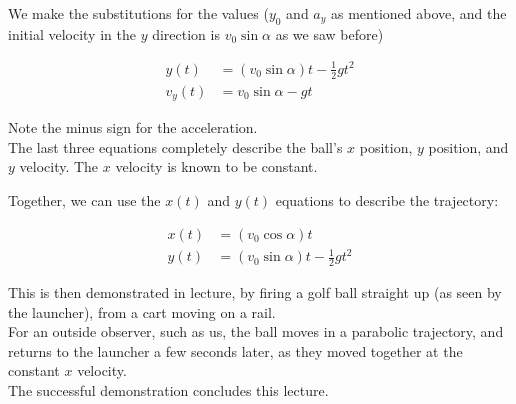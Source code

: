 We make the substitutions for the values ($y_0$ and $a_y$ as mentioned above, and the initial velocity in the $y$ direction is $v_0 \sin \alpha$ as we saw before)

\begin{align}
y(t) &= (v_0 \sin \alpha) t - \frac{1}{2} g t^2\\
v_y(t) &= v_0 \sin \alpha - g t
\end{align}

Note the minus sign for the acceleration.\\
The last three equations completely describe the ball's $x$ position, $y$ position, and $y$ velocity. The $x$ velocity is known to be constant.

Together, we can use the $x(t)$ and $y(t)$ equations to describe the trajectory:

\begin{align*}
x(t) &= (v_0 \cos \alpha) t\\
y(t) &= (v_0 \sin \alpha) t - \frac{1}{2} g t^2
\end{align*}

This is then demonstrated in lecture, by firing a golf ball straight up (as seen by the launcher), from a cart moving on a rail.\\
For an outside observer, such as us, the ball moves in a parabolic trajectory, and returns to the launcher a few seconds later, as they moved together at the constant $x$ velocity.\\
The successful demonstration concludes this lecture.
